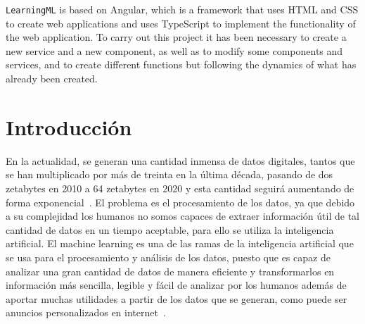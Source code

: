 \documentclass[a4paper, 12pt]{book}
\begin{document}
\texttt{LearningML} is based on Angular, which is a framework that uses HTML and CSS to create web applications and uses TypeScript to implement the functionality of the web application. To carry out this project it has been necessary to create a new service and a new component, as well as to modify some components and services, and to create different functions but following the dynamics of what has already been created.




\tableofcontents 
\cleardoublepage
\listoffigures %



\cleardoublepage
\chapter{Introducción}
\label{sec:intro} %

En la actualidad, se generan una cantidad inmensa de datos digitales, tantos que se han multiplicado por más de treinta en la última década, pasando de dos zetabytes en 2010 a 64 zetabytes en 2020 y esta cantidad seguirá aumentando de forma exponencial~\cite{Pagina_de_Datos}. 
El problema es el procesamiento de los datos, ya que debido a su complejidad los humanos no somos capaces de extraer información útil de tal cantidad de datos en un tiempo aceptable, para ello se utiliza la inteligencia artificial. 
El machine learning es una de las ramas de la inteligencia artificial que se usa para el procesamiento y análisis de los datos, puesto que es capaz de analizar una gran cantidad de datos de manera eficiente y transformarlos en información más sencilla, legible y fácil de analizar por los humanos además de aportar muchas utilidades a partir de los datos que se generan, como puede ser anuncios personalizados en internet~\cite{rouhiainen2018inteligencia}.
\end{document}
